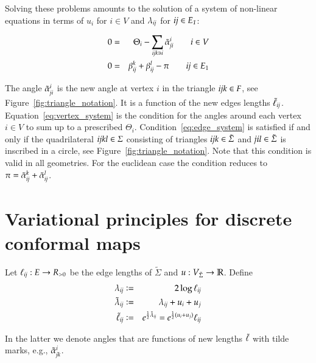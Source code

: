 \documentclass[Thesis]{subfiles}
\begin{document}
Solving these problems amounts to the solution of a system of non-linear equations in terms of $u_i$ for $i\in V$ and $\lambda_{\it ij}$ for $\it ij \in E_1$:

\begin{eqnarray}
	0 &=&\Theta_i-\sum_{\it ijk \ni i}\tilde{\alpha}_{\it ji}^i \quad\quad i\in V\label{eq:vertex_system}\\
	0 &=& \beta_{\it ij}^k+\beta_{\it ij}^l - \pi \quad\quad \textit{ij} \in E_1\label{eq:edge_system}
\end{eqnarray}

The angle $\tilde{\alpha}_{\it ji}^i$ is the new angle at vertex $i$ in the triangle $\it ijk\in F$, see Figure~\ref{fig:triangle_notation}.
It is a function of the new edges lengths $\tilde\ell_{\it ij}$.
Equation~\ref{eq:vertex_system} is the condition for the angles around each vertex $i \in V$ to sum up to a prescribed $\Theta_i$.
Condition~\ref{eq:edge_system} is satisfied if and only if the quadrilateral $\it ijkl\in \Sigma$ consisting of triangles $\it ijk\in \tilde \Sigma$ and $\it jil\in \tilde \Sigma$ is inscribed in a circle, see Figure~\ref{fig:triangle_notation}. 
Note that this condition is valid in all geometries. For the euclidean case the condition reduces to $\pi=\tilde{\alpha}_{\it ij}^k + \tilde{\alpha}_{\it ij}^l$.

\section{Variational principles for discrete conformal maps}
\label{sec:vari-princ}

\begin{definition}
Let $\ell_{\it ij}:E\to R_{>0}$ be the edge lengths of $\tilde \Sigma$ and $u:V_{\tilde\Sigma}\rightarrow\mathbb R$. Define
\begin{eqnarray*}
\lambda_{\it ij} &\vcentcolon=& 2\log \ell_{\it ij}\label{eq:lambda_def}\\
\tilde\lambda_{\it ij} &\vcentcolon=& \lambda_{\it ij}+u_i+u_j\\
\tilde \ell_{\it ij} &\vcentcolon=& e^{\frac{1}{2}\tilde \lambda_{\it ij}}=e^{\frac{1}{2}(u_i + u_j)}\ell_{\it ij}
\end{eqnarray*}
\end{definition}
In the latter we denote angles that are functions of new lengths $\tilde{\ell}$ with tilde marks, e.g., $\tilde{\alpha}_{\it jk}^i$.
\end{document}
